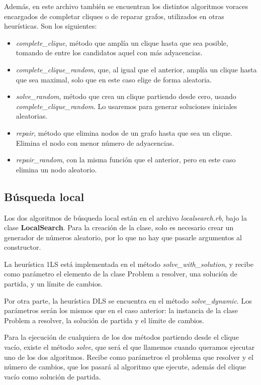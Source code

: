 Además, en este archivo también se encuentran los distintos algoritmos voraces
encargados de completar cliques o de reparar grafos, utilizados en otras heurísticas.
Son los siguientes:

\begin{itemize}
  \item \textit{complete\_clique}, método que amplía un clique hasta que sea posible,
        tomando de entre los candidatos aquel con más adyacencias.
  \item \textit{complete\_clique\_random}, que, al igual que el anterior, amplía
        un clique hasta que sea maximal, solo que en este caso elige de forma aleatoria.
  \item \textit{solve\_random}, método que crea un clique partiendo desde cero, usando
        \textit{complete\_clique\_random}. Lo usaremos para generar soluciones iniciales
        aleatorias.
  \item \textit{repair}, método que elimina nodos de un grafo hasta que sea un clique.
        Elimina el nodo con menor número de adyacencias.
  \item \textit{repair\_random}, con la misma función que el anterior, pero en este
        caso elimina un nodo aleatorio.
\end{itemize}

\subsection{Búsqueda local}

Los dos algoritmos de búsqueda local están en el archivo \textit{localsearch.rb},
bajo la clase \textbf{LocalSearch}. Para la creación de la clase, solo es necesario
crear un generador de números aleatorio, por lo que no hay que pasarle argumentos
al constructor.

La heurística 1LS está implementada en el método \textit{solve\_with\_solution}, y
recibe como parámetro el elemento de la clase Problem a resolver, una solución
de partida, y un límite de cambios.

Por otra parte, la heurística DLS se encuentra en el método \textit{solve\_dynamic}.
Los parámetros serán los mismos que en el caso anterior: la instancia de la clase
Problem a resolver, la solución de partida y el límite de cambios.

Para la ejecución de cualquiera de los dos métodos partiendo desde el clique
vacío, existe el método \textit{solve}, que será el que llamemos cuando queramos
ejecutar uno de los dos algoritmos. Recibe como parámetros el problema que resolver
y el número de cambios, que los pasará al algoritmo que ejecute, además del clique
vacío como solución de partida.

